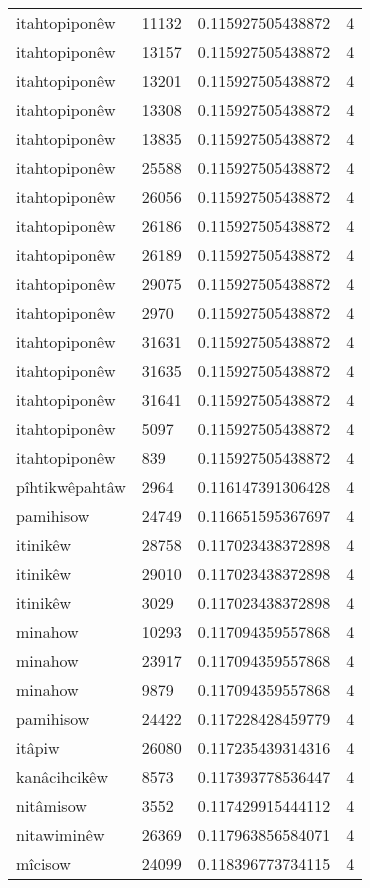 \begin{longtable}{llll}
itahtopiponêw & 11132 & 0.115927505438872 & 4 \\
itahtopiponêw & 13157 & 0.115927505438872 & 4 \\
itahtopiponêw & 13201 & 0.115927505438872 & 4 \\
itahtopiponêw & 13308 & 0.115927505438872 & 4 \\
itahtopiponêw & 13835 & 0.115927505438872 & 4 \\
itahtopiponêw & 25588 & 0.115927505438872 & 4 \\
itahtopiponêw & 26056 & 0.115927505438872 & 4 \\
itahtopiponêw & 26186 & 0.115927505438872 & 4 \\
itahtopiponêw & 26189 & 0.115927505438872 & 4 \\
itahtopiponêw & 29075 & 0.115927505438872 & 4 \\
itahtopiponêw & 2970 & 0.115927505438872 & 4 \\
itahtopiponêw & 31631 & 0.115927505438872 & 4 \\
itahtopiponêw & 31635 & 0.115927505438872 & 4 \\
itahtopiponêw & 31641 & 0.115927505438872 & 4 \\
itahtopiponêw & 5097 & 0.115927505438872 & 4 \\
itahtopiponêw & 839 & 0.115927505438872 & 4 \\
pîhtikwêpahtâw & 2964 & 0.116147391306428 & 4 \\
pamihisow & 24749 & 0.116651595367697 & 4 \\
itinikêw & 28758 & 0.117023438372898 & 4 \\
itinikêw & 29010 & 0.117023438372898 & 4 \\
itinikêw & 3029 & 0.117023438372898 & 4 \\
minahow & 10293 & 0.117094359557868 & 4 \\
minahow & 23917 & 0.117094359557868 & 4 \\
minahow & 9879 & 0.117094359557868 & 4 \\
pamihisow & 24422 & 0.117228428459779 & 4 \\
itâpiw & 26080 & 0.117235439314316 & 4 \\
kanâcihcikêw & 8573 & 0.117393778536447 & 4 \\
nitâmisow & 3552 & 0.117429915444112 & 4 \\
nitawiminêw & 26369 & 0.117963856584071 & 4 \\
mîcisow & 24099 & 0.118396773734115 & 4 \\

\end{longtable}
